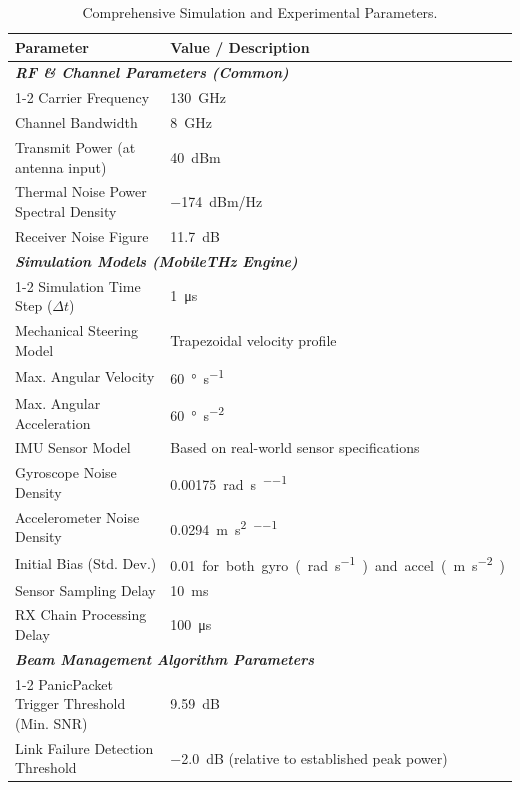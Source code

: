 \documentclass[fleqn,10pt]{wlscirep}
\begin{document}
\begin{table}[h!]
\centering
\caption{Comprehensive Simulation and Experimental Parameters.}
\label{tab:comprehensive_parameters}
\begin{tabular}{@{}ll@{}}
\toprule
\textbf{Parameter} & \textbf{Value / Description} \\
\midrule
\multicolumn{2}{l}{\textit{\textbf{RF \& Channel Parameters (Common)}}} \\
\cmidrule(r){1-2}
Carrier Frequency & \SI{130}{\giga\hertz} \\
Channel Bandwidth & \SI{8}{\giga\hertz} \\
Transmit Power (at antenna input) & \SI{40}{dBm} \\
Thermal Noise Power Spectral Density & \SI{-174}{dBm/Hz} \\
Receiver Noise Figure & \SI{11.7}{\deci\bel}\\
\midrule
\multicolumn{2}{l}{\textit{\textbf{Simulation Models (MobileTHz Engine)}}} \\
\cmidrule(r){1-2}
Simulation Time Step ($\Delta t$) & \SI{1}{\micro\second} \\
Mechanical Steering Model & Trapezoidal velocity profile \\
\quad Max. Angular Velocity & \SI{60}{\degree\per\second} \\
\quad Max. Angular Acceleration & \SI{60}{\degree\per\second\squared} \\
IMU Sensor Model & Based on real-world sensor specifications \\
\quad Gyroscope Noise Density & \SI{0.00175}{\radian\per\second\per\sqrt{\hertz}} \\
\quad Accelerometer Noise Density & \SI{0.0294}{\meter\per\second\squared\per\sqrt{\hertz}} \\
\quad Initial Bias (Std. Dev.) & \SI{0.01} for both gyro (\si{\radian\per\second}) and accel (\si{\meter\per\second\squared}) \\
\quad Sensor Sampling Delay & \SI{10}{\milli\second} \\
RX Chain Processing Delay & \SI{100}{\micro\second} \\
\midrule
\multicolumn{2}{l}{\textit{\textbf{Beam Management Algorithm Parameters}}} \\
\cmidrule(r){1-2}
PanicPacket Trigger Threshold (Min. SNR) & \SI{9.59}{\deci\bel} \\
Link Failure Detection Threshold & \SI{-2.0}{\deci\bel} (relative to established peak power) \\

\end{tabular}
\end{table}
\end{document}
